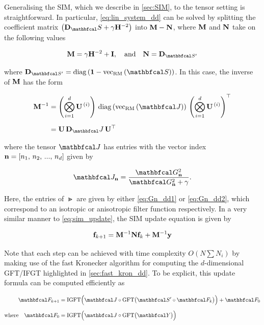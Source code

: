 Generalising the SIM, which we describe in \cref{sec:SIM}, to the tensor setting is straightforward. In particular, \cref{eq:lin_system_dd} can be solved by splitting the coefficient matrix $\left(\D_\St + \gamma \HH^{-2}\right)$ into $\mathbf{M} - \mathbf{N}$, where $\mathbf{M}$ and $\mathbf{N}$ take on the following values
 
\begin{equation}
    \M = \gamma \HH^{-2} + \I, \aand \N = \D_{\St'}
\end{equation}

where $\D_{\St'} = \diag{\mathbf{1} - \vecrm{\St}}$. In this case, the inverse of $\mathbf{M}$ has the form 


\begin{align}
\M^{-1} &= \left( \bigotimes_{i=1}^d  \U^{\,(i)} \right) \, \diag{\vecrm{\Jt}}\, \left(\bigotimes_{i=1}^d  \U^{\,(i)} \right)^\top \notag \\[0.2cm]
&= \U \, \D_\Jt \, \U^\top
\end{align}

where the tensor $\Jt$ has entries with the vector index $\mathbf{n} = [n_1,\, n_2,\, ...,\, n_d]$ given by 

\begin{equation}
    \Jt_{\nn} = \frac{\Gt_{\nn}^2}{\Gt_{\nn}^2 + \gamma}.
\end{equation}

Here, the entries of $\Gt$ are given by either \cref{eq:Gn_dd1} or \cref{eq:Gn_dd2}, which correspond to an isotropic or anisotropic filter function respectively. In a very similar manner to \cref{eq:sim_update}, the SIM update equation is given by 

\begin{equation}
    \label{eq:sim_update_dd}
    \mathbf{f}_{k+1} = \mathbf{M}^{-1}\mathbf{N} \mathbf{f}_{k} + \mathbf{M}^{-1} \mathbf{y}
\end{equation}

Note that each step can be achieved with time complexity $O(N \sum N_i)$ by making use of the fast Kronecker algorithm for computing the $d$-dimensional GFT/IFGT highlighted in \cref{sec:fast_kron_dd}. To be explicit, this update formula can be computed efficiently as 

\begin{align*}
    \Ft_{k+1} &= \text{IGFT} \Big( \Jt \circ \text{GFT}\big(\St' \circ \Ft_{k}\big)\Big)  + \Ft_{0} \\[0.2cm]
    \text{where} \quad \Ft_{0} &= \text{IGFT} \Big( \Jt \circ \text{GFT}\big(\Yt \big)\Big) 
\end{align*}

